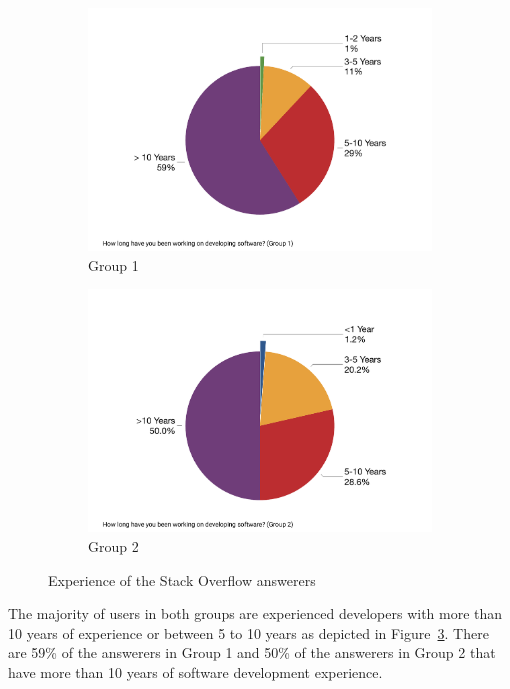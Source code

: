 \documentclass{svjour3}                     %
\begin{document}
\begin{figure}
	\begin{subfigure}{.5\textwidth}
		\centering
		\includegraphics[width=0.8\linewidth]{survey_exp_1}
		\caption{Group 1}
		\label{fig:survey_group1_exp}
	\end{subfigure}%
	\begin{subfigure}{.5\textwidth}
		\centering
		\includegraphics[width=0.8\linewidth]{survey_exp_2}
		\caption{Group 2}
		\label{fig:survey_group2_exp}
	\end{subfigure}
	\caption{Experience of the Stack Overflow answerers}
	\label{fig:survey_exp}
\end{figure}

The majority of users in both groups are experienced developers with more than
10 years of experience or between 5 to 10 years as depicted in
Figure~\ref{fig:survey_exp}. There are 59\% of the answerers in Group 1 
and 50\% of the answerers in Group 2 that
have more than 10 years of software development experience.
\end{document}

